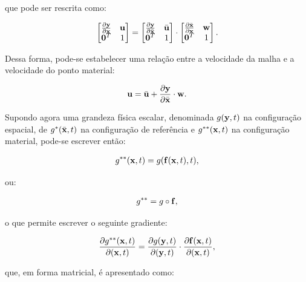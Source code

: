 \documentclass[tese_patricia]{subfiles}%
\begin{document}
\noindent que pode ser rescrita como:

\begin{align}
	\begin{bmatrix}
		\frac{\partial {\mathbf{y}}}{\partial {\mathbf{x}}} & \mathbf{u} \\
		\mathbf{0}^T & 1 \\
	\end{bmatrix}
	=
	\begin{bmatrix}
		\frac{\partial {\mathbf{y}}}{\partial {\bar{\mathbf{x}}}} & \bar{\mathbf{u}} \\
		\mathbf{0}^T & 1 \\
	\end{bmatrix}
	\cdot
	\begin{bmatrix}
		\frac{\partial {\bar{\mathbf{x}}}}{\partial {\mathbf{x}}} & \mathbf{w} \\
		\mathbf{0}^T & 1 \\
	\end{bmatrix} .
\end{align}

Dessa forma, pode-se estabelecer uma relação entre a velocidade da malha e a velocidade do ponto material:

\begin{align}
	\mathbf{u} = \bar{\mathbf{u}} + \frac{\partial{\mathbf{y}}}{\partial{\bar{\mathbf{x}}}}\cdot \mathbf{w}. \label{eq:vel_rel_mat_ALE}
\end{align}

Supondo agora uma grandeza física escalar, denominada $g(\mathbf{y},t)$ na configuração espacial, de $g^{*}(\bar{\mathbf{x}},t)$ na configuração de referência e $g^{**}(\mathbf{x},t)$ na configuração material, pode-se escrever então:

\begin{align}
	g^{**}(\mathbf{x},t) = g(\mathbf{f}(\mathbf{x},t),t), 
\end{align}

\noindent ou:

\begin{align}
	g^{**} = g  \circ \mathbf{f},
\end{align}

\noindent o que permite escrever o seguinte gradiente:

\begin{align}
	\frac{\partial g^{**}(\mathbf{x},t)}{\partial (\mathbf{x},t)} = \frac{\partial g(\mathbf{y},t)}{\partial (\mathbf{y},t)} \cdot \frac{\partial \mathbf{f}(\mathbf{x},t)}{\partial (\mathbf{x},t)},
\end{align}

\noindent que, em forma matricial, é apresentado como:
\end{document}

